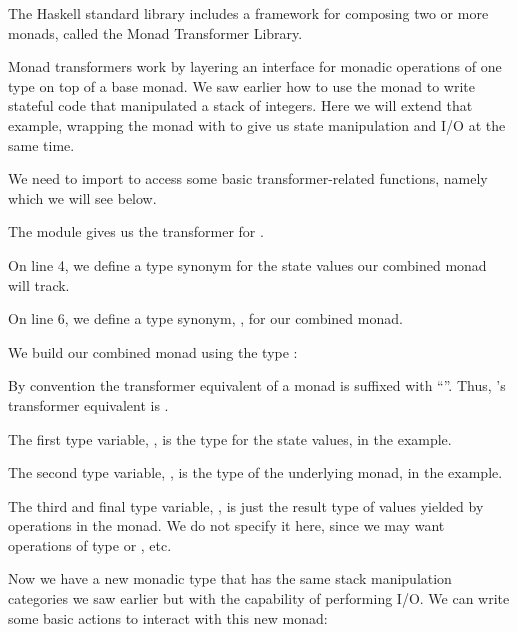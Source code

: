 The Haskell standard library includes a framework for composing two or more monads, called the Monad Transformer
Library. 

Monad transformers work by layering an interface for monadic operations of one type on top of a base monad.
We saw earlier how to use the  monad to write stateful code that manipulated a stack of integers.
Here we will extend that example, wrapping the  monad with  to give us state manipulation
and I/O at the same time.



\begin{notelist}
    \item We need to import  to access some basic transformer-related functions, namely 
          which we will see below.
    \item The  module gives us the transformer for .
    \item On line 4, we define a type synonym for the state values our combined monad will track.
    \item On line 6, we define a type synonym, , for our combined monad. 
    \item We build our combined monad using the type :
        \begin{notelist}
            \item By convention the transformer equivalent of a monad is suffixed with ``''. Thus, 's
                  transformer equivalent is .
            \item The first type variable, , is the type for the state values,  in the example.
            \item The second type variable, , is the type of the underlying monad,  in the example.
            \item The third and final type variable, , is just the result type of values yielded by operations
                  in the monad. We do not specify it here, since we may want operations of type 
                  or , etc.
        \end{notelist}
\end{notelist}

Now we have a new monadic type that has the same stack manipulation categories we saw earlier but with the capability of
performing I/O. We can write some basic actions to interact with this new monad:

